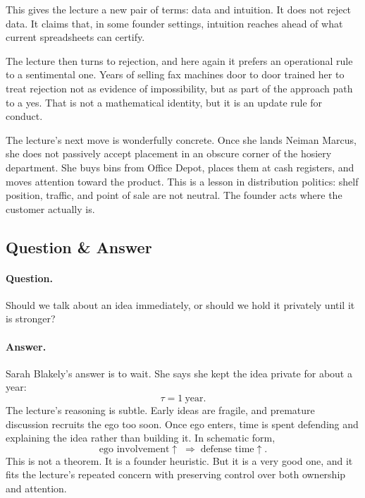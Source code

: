 This gives the lecture a new pair of terms: data and intuition. It does not reject data. It claims that, in some founder settings, intuition reaches ahead of what current spreadsheets can certify.

The lecture then turns to rejection, and here again it prefers an operational rule to a sentimental one. Years of selling fax machines door to door trained her to treat rejection not as evidence of impossibility, but as part of the approach path to a yes. That is not a mathematical identity, but it is an update rule for conduct.

The lecture's next move is wonderfully concrete. Once she lands Neiman Marcus, she does not passively accept placement in an obscure corner of the hosiery department. She buys bins from Office Depot, places them at cash registers, and moves attention toward the product. This is a lesson in distribution politics: shelf position, traffic, and point of sale are not neutral. The founder acts where the customer actually is.

\subsection{Question \& Answer}

\paragraph{Question.} Should we talk about an idea immediately, or should we hold it privately until it is stronger?

\paragraph{Answer.} Sarah Blakely's answer is to wait. She says she kept the idea private for about a year:
\begin{equation}
\tau = 1\ \text{year}.
\end{equation}
The lecture's reasoning is subtle. Early ideas are fragile, and premature discussion recruits the ego too soon. Once ego enters, time is spent defending and explaining the idea rather than building it. In schematic form,
\begin{equation}
\text{ego involvement} \uparrow \;\Rightarrow\; \text{defense time} \uparrow.
\end{equation}
This is not a theorem. It is a founder heuristic. But it is a very good one, and it fits the lecture's repeated concern with preserving control over both ownership and attention.

